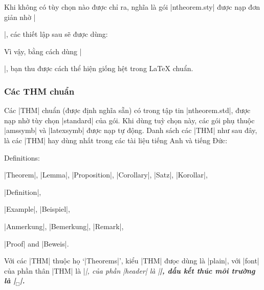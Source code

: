 Khi không có tùy chọn nào được chỉ ra, nghĩa là gói |ntheorem.sty|
được nạp đơn giản nhờ |\usepackage{ntheorem}|, các thiết lập sau
sẽ được dùng:
\begin{example} 
  \theoremstyle{plain}
  \theoremheaderfont{\normalfont\bfseries}
  \theorembodyfont{\itshape}
  \theoremseparator{}
  \theoremsymbol{}
\end{example}
Vì vậy, bằng cách dùng |\newtheorem{...}{...}|, bạn thu được
cách thể hiện giống hệt trong \LaTeX{} chuẩn.

\subsubsection{Các THM chuẩn}
\label{sec:standard}

Các |THM| chuẩn (được định nghĩa sẵn) có trong tập tin |ntheorem.std|,
được nạp nhờ tùy chọn |standard| của gói. Khi dùng tuỳ chọn này,
các gói phụ thuộc |amssymb| và |latexsymb| được nạp tự động.
Danh sách các |THM| như sau đây, là các |THM| hay dùng nhất
trong các tài liệu tiếng Anh và tiếng Đức:
\begin{nlist}{Definitions:}
 \item[Theorems:]  |Theorem|, |Lemma|, |Proposition|,
  |Corollary|, |Satz|, |Korollar|,
 \item[Definitions:] |Definition|,
 \item[Examples:] |Example|, |Beispiel|,
 \item[Remarks:] |Anmerkung|, |Bemerkung|, |Remark|,
 \item[Proofs:] |Proof| and |Beweis|.
\end{nlist}

Với các |THM| thuộc họ `|Theorems|', kiểu |THM| đưọc dùng là |plain|,
với |font| của phần thân |THM| là |\itshape|, của phần |header|
là |\bfseries|, dấu kết thúc môi trường là |\ensuremath{_\Box}|.

